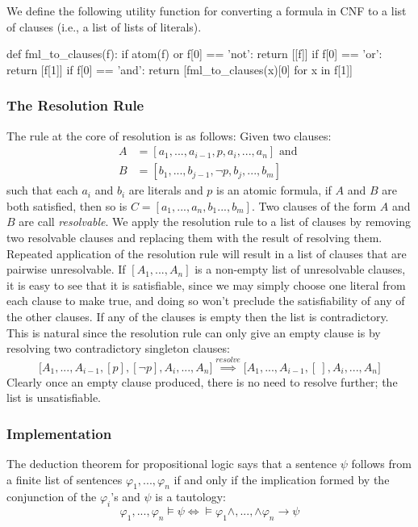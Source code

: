 \documentclass[a4paper,notitlepage]{scrartcl}
\let\phi\varphi
\begin{document}
We define the following utility function for converting a formula in CNF to
   a list of clauses (i.e., a list of lists of literals).
\begin{code}
def fml_to_clauses(f):
    if atom(f) or f[0] == 'not':
        return [[f]]
    if f[0] == 'or': 
        return [f[1]]
    if f[0] == 'and':
        return [fml_to_clauses(x)[0] for x in f[1]]
\end{code}


\subsubsection{The Resolution Rule}
The rule at the core of resolution is as follows:
Given two clauses:
\begin{align*}
A &= [a_1,...,a_{i-1}, p, a_{i},...,a_n]\text{ and }\\
B &= [b_1,...,b_{j-1},\lnot p, b_{j}, ..., b_m]
\end{align*}
such that each $a_i$ and $b_i$ are literals and $p$ is an atomic formula,
if $A$ and $B$ are both satisfied, then so 
   is $C = [a_1,..., a_n, b_1..., b_m]$.
Two clauses of the form $A$ and $B$ are call \emph{resolvable}.
We apply the resolution rule to a list of clauses by removing two resolvable
   clauses and replacing them with the result of resolving them.
Repeated application of the resolution rule will result in a list of clauses
   that are pairwise unresolvable.
If $[A_1,...,A_n]$ is a non-empty list of unresolvable clauses, it is easy 
   to see that it is satisfiable, since we may simply choose one literal 
   from each clause to make true, and doing so won't preclude the 
   satisfiability of any of the other clauses.
If any of the clauses is empty then the list is contradictory.
This is natural since the resolution rule can only give an
   empty clause is by resolving two contradictory singleton clauses:
\[
\big[A_1,..., A_{i-1}, [p], [\lnot p], A_i,..., A_n\big] \overset{resolve}\implies
\big[A_1,..., A_{i-1}, [\ ], A_i,..., A_n\big]
\]
Clearly once an empty clause produced, there is no need to resolve further;
   the list is unsatisfiable.

\subsubsection{Implementation}

The deduction theorem for propositional logic says that a sentence $\psi$
   follows from a finite list of sentences $\phi_1,...,\phi_n$ if and only
   if the implication formed by the conjunction of the $\phi_i$'s and $\psi$
   is a tautology:
\[
\phi_1,...,\phi_n\models\psi \iff \models\phi_1\land,...,\land\phi_n
   \rightarrow\psi
\]
\end{document}
